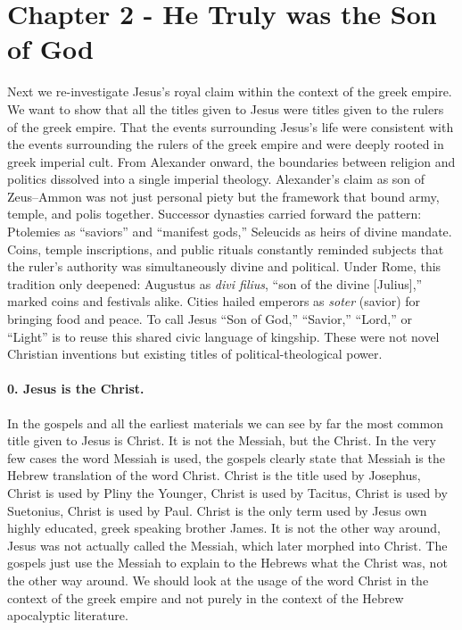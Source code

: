 \section{Chapter 2 - He Truly was the Son of God}\label{sec:chapter-2-he-truly-was-the-son-of-god}
Next we re-investigate Jesus’s royal claim within the context of the greek empire.
We want to show that all the titles given to Jesus were titles given to the rulers of the greek empire.
That the events surrounding Jesus’s life were consistent with the events surrounding the rulers of the greek empire and were deeply rooted in greek imperial cult.
From Alexander onward, the boundaries between religion and politics dissolved into a single imperial theology.
Alexander’s claim as son of Zeus–Ammon was not just personal piety but the framework that bound army, temple, and polis together.
Successor dynasties carried forward the pattern: Ptolemies as “saviors” and “manifest gods,” Seleucids as heirs of divine mandate.
Coins, temple inscriptions, and public rituals constantly reminded subjects that the ruler’s authority was simultaneously divine and political.
Under Rome, this tradition only deepened: Augustus as \emph{divi filius}, “son of the divine [Julius],” marked coins and festivals alike.
Cities hailed emperors as \emph{soter} (savior) for bringing food and peace.
To call Jesus “Son of God,” “Savior,” “Lord,” or “Light” is to reuse this shared civic language of kingship.
These were not novel Christian inventions but existing titles of political-theological power.

\paragraph{0.
Jesus is the Christ.}\label{par:jesus-is-the-christ.}
In the gospels and all the earliest materials we can see by far the most common title given to Jesus is Christ.
It is not the Messiah, but the Christ.
In the very few cases the word Messiah is used, the gospels clearly state that Messiah is the Hebrew translation of the word Christ.
Christ is the title used by Josephus, Christ is used by Pliny the Younger, Christ is used by Tacitus, Christ is used by Suetonius, Christ is used by Paul.
Christ is the only term used by Jesus own highly educated, greek speaking brother James.
It is not the other way around, Jesus was not actually called the Messiah, which later morphed into Christ.
The gospels just use the Messiah to explain to the Hebrews what the Christ was, not the other way around.
We should look at the usage of the word Christ in the context of the greek empire and not purely in the context of the Hebrew apocalyptic literature.


